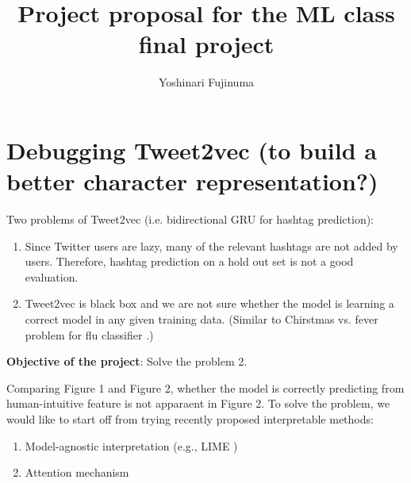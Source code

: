 \documentclass[11pt]{article}
\begin{document}
\vspace{-1cm}
\title{\vspace{-2ex}Project proposal for the ML class final project\vspace{-2ex}}
\author{Yoshinari Fujinuma\vspace{-2ex}}
\date{\vspace{-2ex}}
\maketitle

\vspace{-0.5cm}

\section{Debugging Tweet2vec (to build a better character representation?)}

Two problems of Tweet2vec \cite{dhingra-EtAl:2016:P16-2} (i.e. bidirectional GRU for hashtag prediction):

\begin{enumerate}
 \setlength\itemsep{0.01em}
 \item  Since Twitter users are lazy, many of the relevant hashtags are not added by users. Therefore, hashtag prediction on a hold out set is not a good evaluation.
 \item Tweet2vec is black box and we are not sure whether the model is learning a correct model in any given training data. (Similar to Chirstmas vs. fever problem for flu classifier \cite{Paul-2016} .)
\end{enumerate}

{\bf Objective of the project}: Solve the problem 2.

Comparing Figure 1 and Figure 2, whether the model is correctly predicting from human-intuitive feature is not apparaent in Figure 2. %
To solve the problem, we would like to start off from trying recently proposed interpretable methods:
\begin{enumerate}
 \item Model-agnostic interpretation (e.g., LIME \cite{Ribeiro:2016})
 \item Attention mechanism \cite{luong-pham-manning:2015:EMNLP}
\end{enumerate}
\end{document}
